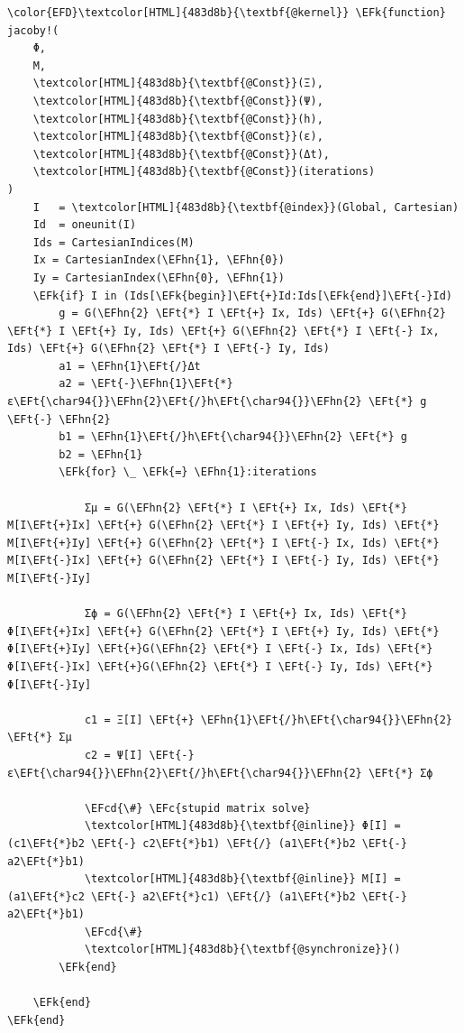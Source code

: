 \documentclass{mimosis}
\newcommand{\EFc}[1]{\textcolor{EFc}{#1}} %
\newcommand{\EFcd}[1]{\textcolor{EFcd}{#1}} %
\newcommand{\EFk}[1]{\textcolor{EFk}{#1}} %
\newcommand{\EFt}[1]{\textcolor{EFt}{#1}} %
\newcommand{\EFhn}[1]{\textcolor{EFhn}{#1}} %
\begin{document}
\begin{Code}
\begin{Verbatim}
\color{EFD}\textcolor[HTML]{483d8b}{\textbf{@kernel}} \EFk{function} jacoby!(
    Φ,
    M,
    \textcolor[HTML]{483d8b}{\textbf{@Const}}(Ξ),
    \textcolor[HTML]{483d8b}{\textbf{@Const}}(Ψ),
    \textcolor[HTML]{483d8b}{\textbf{@Const}}(h),
    \textcolor[HTML]{483d8b}{\textbf{@Const}}(ε),
    \textcolor[HTML]{483d8b}{\textbf{@Const}}(Δt),
    \textcolor[HTML]{483d8b}{\textbf{@Const}}(iterations)
)
    I   = \textcolor[HTML]{483d8b}{\textbf{@index}}(Global, Cartesian)
    Id  = oneunit(I)
    Ids = CartesianIndices(M)
    Ix = CartesianIndex(\EFhn{1}, \EFhn{0})
    Iy = CartesianIndex(\EFhn{0}, \EFhn{1})
    \EFk{if} I in (Ids[\EFk{begin}]\EFt{+}Id:Ids[\EFk{end}]\EFt{-}Id)
        g = G(\EFhn{2} \EFt{*} I \EFt{+} Ix, Ids) \EFt{+} G(\EFhn{2} \EFt{*} I \EFt{+} Iy, Ids) \EFt{+} G(\EFhn{2} \EFt{*} I \EFt{-} Ix, Ids) \EFt{+} G(\EFhn{2} \EFt{*} I \EFt{-} Iy, Ids)
        a1 = \EFhn{1}\EFt{/}Δt
        a2 = \EFt{-}\EFhn{1}\EFt{*} ε\EFt{\char94{}}\EFhn{2}\EFt{/}h\EFt{\char94{}}\EFhn{2} \EFt{*} g  \EFt{-} \EFhn{2}
        b1 = \EFhn{1}\EFt{/}h\EFt{\char94{}}\EFhn{2} \EFt{*} g
        b2 = \EFhn{1}
        \EFk{for} \_ \EFk{=} \EFhn{1}:iterations

            Σμ = G(\EFhn{2} \EFt{*} I \EFt{+} Ix, Ids) \EFt{*} M[I\EFt{+}Ix] \EFt{+} G(\EFhn{2} \EFt{*} I \EFt{+} Iy, Ids) \EFt{*} M[I\EFt{+}Iy] \EFt{+} G(\EFhn{2} \EFt{*} I \EFt{-} Ix, Ids) \EFt{*} M[I\EFt{-}Ix] \EFt{+} G(\EFhn{2} \EFt{*} I \EFt{-} Iy, Ids) \EFt{*} M[I\EFt{-}Iy]

            Σϕ = G(\EFhn{2} \EFt{*} I \EFt{+} Ix, Ids) \EFt{*} Φ[I\EFt{+}Ix] \EFt{+} G(\EFhn{2} \EFt{*} I \EFt{+} Iy, Ids) \EFt{*} Φ[I\EFt{+}Iy] \EFt{+}G(\EFhn{2} \EFt{*} I \EFt{-} Ix, Ids) \EFt{*} Φ[I\EFt{-}Ix] \EFt{+}G(\EFhn{2} \EFt{*} I \EFt{-} Iy, Ids) \EFt{*} Φ[I\EFt{-}Iy]

            c1 = Ξ[I] \EFt{+} \EFhn{1}\EFt{/}h\EFt{\char94{}}\EFhn{2}   \EFt{*} Σμ
            c2 = Ψ[I] \EFt{-} ε\EFt{\char94{}}\EFhn{2}\EFt{/}h\EFt{\char94{}}\EFhn{2} \EFt{*} Σϕ

            \EFcd{\#} \EFc{stupid matrix solve}
            \textcolor[HTML]{483d8b}{\textbf{@inline}} Φ[I] = (c1\EFt{*}b2 \EFt{-} c2\EFt{*}b1) \EFt{/} (a1\EFt{*}b2 \EFt{-} a2\EFt{*}b1)
            \textcolor[HTML]{483d8b}{\textbf{@inline}} M[I] = (a1\EFt{*}c2 \EFt{-} a2\EFt{*}c1) \EFt{/} (a1\EFt{*}b2 \EFt{-} a2\EFt{*}b1)
            \EFcd{\#}
            \textcolor[HTML]{483d8b}{\textbf{@synchronize}}()
        \EFk{end}

    \EFk{end}
\EFk{end}
\end{Verbatim}
\end{Code}
\end{document}
